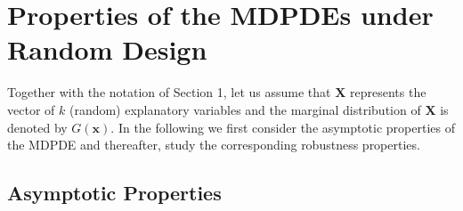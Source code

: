 \documentclass[a4paper]{article}%
\begin{document}
\section{Properties of the MDPDEs under Random Design\label{sec2}}


Together with the notation of Section 1, 
let us assume that $\boldsymbol{X}$ represents the vector of $k$ (random) explanatory variables
and the marginal distribution of $\boldsymbol{X}$ is denoted by $G(\boldsymbol{x})$. 
In the following we first consider the asymptotic properties of the MDPDE and
thereafter, study the  corresponding robustness properties.

\subsection{Asymptotic Properties \label{sec2.1}}
\end{document}
